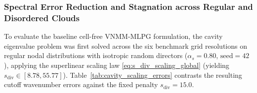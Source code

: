\documentclass[VANCOUVER]{USG}
\begin{document}
\subsubsection{Spectral Error Reduction and Stagnation across Regular and Disordered Clouds}
\label{subsubsec:cavity_jitter_error}

To evaluate the baseline cell-free VNMM-MLPG formulation, the cavity eigenvalue problem was first solved across the six benchmark grid resolutions on regular nodal distributions with isotropic random directors ($\alpha_s = 0.80$, $\text{seed}=42$), applying the superlinear scaling law \eqref{eq:s_div_scaling_global} (yielding $s_{\mathrm{div}} \in [8.78, 55.77]$). Table~\ref{tab:cavity_scaling_errors} contrasts the resulting cutoff wavenumber errors against the fixed penalty $s_{\mathrm{div}} = 15.0$.
\end{document}
